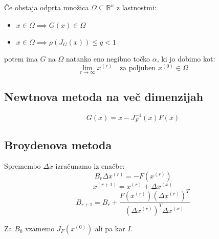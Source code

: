 \begin{multicols}{4}
Če obstaja odprta množica $\Omega \subseteq \mathbb{R}^n$ z lastnostmi:
\begin{itemize}
	\item $x \in \Omega \implies G(x) \in \Omega$
	\item $x \in \Omega \implies \rho(J_G(x)) \leq q < 1$
\end{itemize}
potem ima $G$ na $\Omega$ natanko eno negibno točko $\alpha$, ki jo dobimo kot:
\[ \lim_{r\to \infty} x^{(r)} \quad \text{za poljuben } x^{(0)} \in \Omega \]

\subsection{Newtnova metoda na več dimenzijah}
\[ G(x) = x - J_F^{-1}(x) F(x) \]

\subsection{Broydenova metoda}
Spremembo $\Delta x$ izračunamo iz enačbe:
\[ B_r \Delta x^{(r)} = -F(x^{(r)})\]
\[ x^{(r+1)} = x^{(r)} + \Delta x^{(x)}\]
\[ B_{r+1} = B_r + \frac{F(x^{(r)})(\Delta x^{(r)})^T}{ (\Delta x^{(r)})^T \Delta x^{(x)}}\]

Za $B_0$ vzamemo $J_F(x^{(0)})$ ali pa kar $I$.
\end{multicols}
